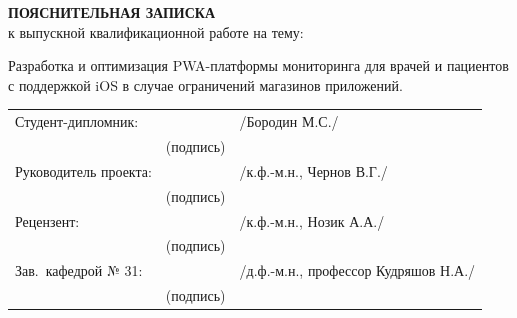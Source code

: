 \newpage
\thispagestyle{empty} %
\vspace*{1.5cm}
\begin{center}
{\Large \textbf{ПОЯСНИТЕЛЬНАЯ ЗАПИСКА}}\\
к выпускной квалификационной работе на тему:

\vspace{1.5cm}

Разработка и оптимизация PWA-платформы мониторинга для врачей и пациентов с поддержкой iOS в случае ограничений магазинов приложений.

\vspace{1.5cm}

\hrulefill
\end{center}

\vspace{1.5cm}

\begin{center}
    \begin{tabular}{p{4.5cm}@{}p{3cm}@{}l}
        Студент-дипломник:&\underline{\hspace{3cm}} &\hspace{0.8cm} /Бородин М.С./ \\
        & \centering\footnotesize(подпись)& \\[1em]

        Руководитель проекта:& \underline{\hspace{3cm}}& \hspace{0.8cm}/к.ф.-м.н., Чернов В.Г./ \\
        & \centering\footnotesize(подпись)& \\[1em]


        Рецензент:&\underline{\hspace{3cm}} &  \hspace{0.8cm}/к.ф.-м.н., Нозик А.А./ \\
        & \centering\footnotesize(подпись)& \\[1em]

        Зав.\ кафедрой № 31: & \underline{\hspace{3cm}}&\hspace{0.8cm} /д.ф.-м.н., профессор Кудряшов Н.А./ \\
        & \centering\footnotesize(подпись)& \\
    \end{tabular}
\end{center}